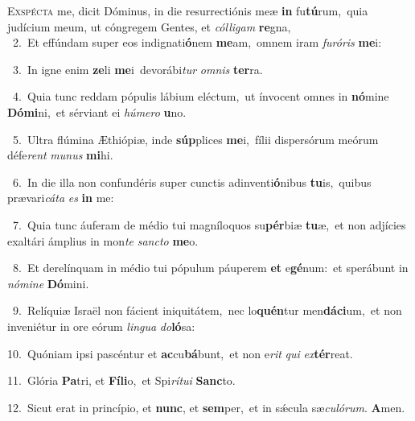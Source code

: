 \lettrine{\initial\textcolor{\initialcolor}{E}}{xspécta} me, dicit Dóminus, in die resurrectiónis meæ \textbf{in} fu\-\textbf{tú}\-rum,~\star quia judícium meum, ut cóngregem Gentes, et \textit{cól}\-\textit{li}\textit{gam} \textbf{re}\-gna,\\
{\numbfont\textcolor{\numbcolor}{~2.}}~Et effúndam super eos indignati\-\textbf{ó}\-nem \textbf{me}\-am,~\star omnem iram \textit{fu}\-\textit{ró}\textit{ris} \textbf{me}\-i:\par
{\numbfont\textcolor{\numbcolor}{~3.}}~In igne enim \textbf{ze}\-li \textbf{me}\-i~\star devorábi\textit{tur} \textit{om}\-\textit{nis} \textbf{ter}\-ra.\par
{\numbfont\textcolor{\numbcolor}{~4.}}~Quia tunc reddam pópulis lábium eléctum,~\dagger ut ínvocent omnes in \textbf{nó}\-mine \textbf{Dó}\-\textbf{mi}ni,~\star et sérviant ei \textit{hú}\-\textit{me}\textit{ro} \textbf{u}\-no.\par
{\numbfont\textcolor{\numbcolor}{~5.}}~Ultra flúmina Æthiópiæ, inde \textbf{súp}\-plices \textbf{me}\-i,~\star fílii dispersórum meórum défe\textit{rent} \textit{mu}\-\textit{nus} \textbf{mi}\-hi.\par
{\numbfont\textcolor{\numbcolor}{~6.}}~In die illa non confundéris super cunctis adinventi\-\textbf{ó}\-nibus \textbf{tu}\-is,~\star quibus prævari\-\textit{cá}\-\textit{ta} \textit{es} \textbf{in} me:\par
{\numbfont\textcolor{\numbcolor}{~7.}}~Quia tunc áuferam de médio tui magníloquos su\-\textbf{pér}\-biæ \textbf{tu}\-æ,~\star et non adjícies exaltári ámplius in mon\textit{te} \textit{sanc}\-\textit{to} \textbf{me}\-o.\par
{\numbfont\textcolor{\numbcolor}{~8.}}~Et derelínquam in médio tui pópulum páuperem \textbf{et} e\-\textbf{gé}\-num:~\star et sperábunt in \textit{nó}\-\textit{mi}\textit{ne} \textbf{Dó}\-mini.\par
{\numbfont\textcolor{\numbcolor}{~9.}}~Relíquiæ Israël non fácient iniquitátem,~\dagger nec lo\-\textbf{quén}\-tur men\-\textbf{dá}\-\textbf{ci}um,~\star et non inveniétur in ore eórum \textit{lin}\-\textit{gua} \textit{do}\-\textbf{ló}sa:\par
{\numbfont\textcolor{\numbcolor}{10.}}~Quóniam ipsi pascéntur et \textbf{ac}\-cu\-\textbf{bá}\-bunt,~\star et non e\textit{rit} \textit{qui} \textit{ex}\-\textbf{tér}reat.\par
{\numbfont\textcolor{\numbcolor}{11.}}~Glória \textbf{Pa}\-tri, et \textbf{Fí}\-\textbf{li}o,~\star et Spi\-\textit{rí}\-\textit{tu}\textit{i} \textbf{Sanc}\-to.\par
{\numbfont\textcolor{\numbcolor}{12.}}~Sicut erat in princípio, et \textbf{nunc}\-, et \textbf{sem}\-per,~\star et in sǽcula sæ\-\textit{cu}\-\textit{ló}\textit{rum}. \textbf{A}\-men.\par
